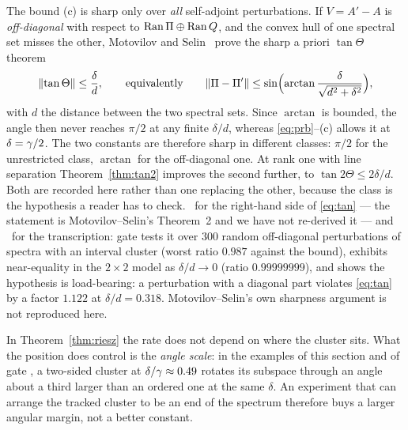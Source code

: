 \begin{remark}\label{rem:tan}
The bound (c) is sharp only over \emph{all} self-adjoint perturbations. If $V=A'-A$ is
\emph{off-diagonal} with respect to $\operatorname{Ran}\Pi\oplus\operatorname{Ran}Q$, and the
convex hull of one spectral set misses the other, Motovilov and Selin \Cc\ prove the sharp
a priori $\tan\Theta$ theorem
\begin{equation}\label{eq:tan}
   \lVert\tan\Theta\rVert\le\frac{\delta}{d},
   \qquad\text{equivalently}\qquad
   \lVert\Pi-\Pi'\rVert\le\sin\Bigl(\arctan\frac{\delta}{\sqrt{d^{2}+\delta^{2}}}\Bigr),
\end{equation}
with $d$ the distance between the two spectral sets. Since $\arctan$ is bounded, the angle then
never reaches $\pi/2$ at any finite $\delta/d$, whereas \eqref{eq:prb}--(c) allows it at
$\delta=\gamma/2$. The two constants are therefore sharp in different classes: $\pi/2$ for the
unrestricted class, $\arctan$ for the off-diagonal one. At rank one with line separation
Theorem~\ref{thm:tan2} improves the second further, to $\tan 2\Theta\le 2\delta/d$. Both are recorded here rather than one
replacing the other, because the class is the hypothesis a reader has to check. \Cc\ for the
right-hand side of \eqref{eq:tan} --- the statement is Motovilov--Selin's Theorem~2 and we have not
re-derived it --- and \V\ for the transcription: gate  tests it over $300$
random off-diagonal perturbations of spectra with an interval cluster (worst ratio $0.987$ against
the bound), exhibits near-equality in the $2\times2$ model as $\delta/d\to0$ (ratio
$0.99999999$), and shows the hypothesis is load-bearing: a perturbation with a diagonal part
violates \eqref{eq:tan} by a factor $1.122$ at $\delta/d=0.318$. Motovilov--Selin's own sharpness
argument is not reproduced here.
\end{remark}

\begin{remark}\label{rem:ordered}
In Theorem~\ref{thm:riesz} the rate does not depend on where the cluster sits. What the position
does control is the \emph{angle scale}: in the examples of this section and of gate
, a two-sided cluster at $\delta/\gamma\approx0.49$ rotates its subspace through an angle
about a third larger than an ordered one at the same $\delta$. An experiment that can arrange the
tracked cluster to be an end of the spectrum therefore buys a larger angular margin, not a better
constant.
\end{remark}

